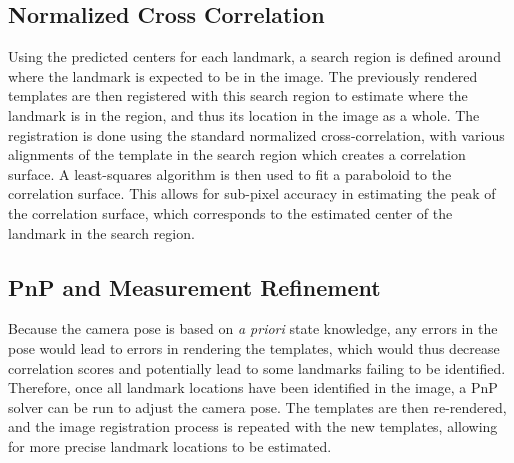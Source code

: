 \documentclass{src/RPI-SIW}
\begin{document}
\subsection*{Normalized Cross Correlation}
Using the predicted centers for each landmark, a search region is defined around where the landmark is expected to be in the image.  The previously rendered templates are then registered with this search region to estimate where the landmark is in the region, and thus its location in the image as a whole.  The registration is done using the standard normalized cross-correlation, with various alignments of the template in the search region which creates a correlation surface.  A least-squares algorithm is then used to fit a paraboloid to the correlation surface.  This allows for sub-pixel accuracy in estimating the peak of the correlation surface, which corresponds to the estimated center of the landmark in the search region.

\subsection*{PnP and Measurement Refinement}
Because the camera pose is based on \textit{a priori} state knowledge, any errors in the pose would lead to errors in rendering the templates, which would thus decrease correlation scores and potentially lead to some landmarks failing to be identified.  Therefore, once all landmark locations have been identified in the image, a PnP solver can be run to adjust the camera pose.  The templates are then re-rendered, and the image registration process is repeated with the new templates, allowing for more precise landmark locations to be estimated.

\end{document}
